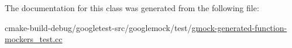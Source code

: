 The documentation for this class was generated from the following file\+:\begin{DoxyCompactItemize}
\item 
cmake-\/build-\/debug/googletest-\/src/googlemock/test/\mbox{\hyperlink{gmock-generated-function-mockers__test_8cc}{gmock-\/generated-\/function-\/mockers\+\_\+test.\+cc}}\end{DoxyCompactItemize}
